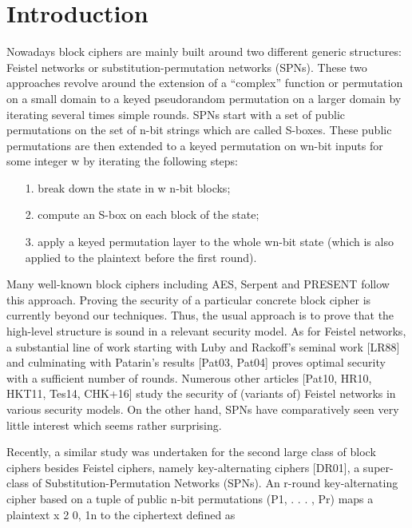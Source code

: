 
\section{Introduction}
\label{section:Introduction}



\medskip{}

Nowadays block ciphers are mainly
built around two different generic structures: Feistel networks or substitution-permutation
networks (SPNs). These two approaches revolve around the extension of a ``complex'' function or permutation on a small domain to a keyed pseudorandom
permutation on a larger domain by iterating several times simple rounds.
SPNs start with a set of public permutations on the set of n-bit strings which
are called S-boxes. These public permutations are then extended to a keyed
permutation on wn-bit inputs for some integer w by iterating the following steps:
\begin{enumerate}
	\item[1.] break down the state in w n-bit blocks;
	\item[2.] compute an S-box on each block of the state;
	\item[3.] apply a keyed permutation layer to the whole wn-bit state (which is also applied to the plaintext before the first round).
\end{enumerate}


Many well-known block ciphers including AES, Serpent and PRESENT follow
this approach. Proving the security of a particular concrete block cipher is
currently beyond our techniques. Thus, the usual approach is to prove that the
high-level structure is sound in a relevant security model. As for Feistel networks,
a substantial line of work starting with Luby and Rackoff's seminal work [LR88]
and culminating with Patarin’s results [Pat03, Pat04] proves optimal security with
a sufficient number of rounds. Numerous other articles [Pat10, HR10, HKT11,
Tes14, CHK+16] study the security of (variants of) Feistel networks in various
security models. On the other hand, SPNs have comparatively seen very little
interest which seems rather surprising.





\medskip{}

Recently, a similar study
was undertaken for the second large class of block ciphers besides Feistel ciphers, namely
key-alternating ciphers [DR01], a super-class of Substitution-Permutation Networks (SPNs).
An r-round key-alternating cipher based on a tuple of public n-bit permutations (P1, . . . , Pr)
maps a plaintext x 2 {0, 1}n to the ciphertext defined as









